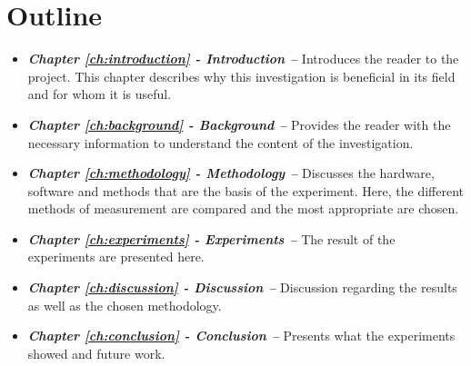 \section{Outline}
\begin{itemize}
    \item \textit{\textbf{Chapter \ref{ch:introduction} - Introduction --}} Introduces the reader to the project. This chapter describes why this investigation is beneficial in its field and for whom it is useful.
    \item \textit{\textbf{Chapter \ref{ch:background} - Background --}} Provides the reader with the necessary information to understand the content of the investigation.
    \item \textit{\textbf{Chapter \ref{ch:methodology} - Methodology --}} Discusses the hardware, software and methods that are the basis of the experiment. Here, the different methods of measurement are compared and the most appropriate are chosen.
    \item \textit{\textbf{Chapter \ref{ch:experiments} - Experiments --}} The result of the experiments are presented here.
    \item \textit{\textbf{Chapter \ref{ch:discussion} - Discussion --}} Discussion regarding the results as well as the chosen methodology.
    \item \textit{\textbf{Chapter \ref{ch:conclusion} - Conclusion --}} Presents what the experiments showed and future work.
\end{itemize}
